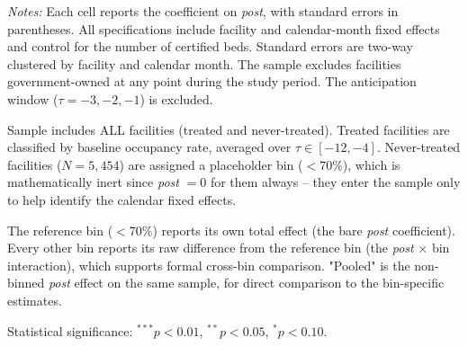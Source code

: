 \begin{table}[!ht]
\begin{threeparttable}
\begin{tablenotes}[flushleft]
\footnotesize
\item \textit{Notes:} Each cell reports the coefficient on \textit{post}, with standard errors in parentheses. All specifications include facility and calendar-month fixed effects and control for the number of certified beds. Standard errors are two-way clustered by facility and calendar month. The sample excludes facilities government-owned at any point during the study period. The anticipation window ($\tau = -3, -2, -1$) is excluded.
\item Sample includes ALL facilities (treated and never-treated). Treated facilities are classified by baseline occupancy rate, averaged over $\tau \in [-12,-4]$. Never-treated facilities ($N = 5,454$) are assigned a placeholder bin ($<$70\%), which is mathematically inert since \textit{post} $= 0$ for them always -- they enter the sample only to help identify the calendar fixed effects.
\item The reference bin ($<$70\%) reports its own total effect (the bare \textit{post} coefficient). Every other bin reports its raw difference from the reference bin (the \textit{post} $\times$ bin interaction), which supports formal cross-bin comparison. "Pooled" is the non-binned \textit{post} effect on the same sample, for direct comparison to the bin-specific estimates.
\item Statistical significance: $^{***}p<0.01$, $^{**}p<0.05$, $^{*}p<0.10$.
\end{tablenotes}

\end{threeparttable}
\end{table}
